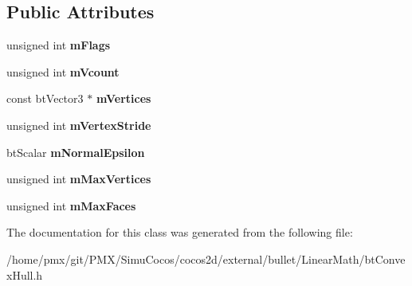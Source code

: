 \subsection*{Public Attributes}
\begin{DoxyCompactItemize}
\item 
\mbox{\label{classHullDesc_a458cec3f34166dbd6e562534deea8eac}} 
unsigned int {\bfseries m\+Flags}
\item 
\mbox{\label{classHullDesc_a294c0dcc9354d0aa20392465d81c2eb1}} 
unsigned int {\bfseries m\+Vcount}
\item 
\mbox{\label{classHullDesc_a9c0f7ac6f59cecf15e65c1f7a8685c06}} 
const bt\+Vector3 $\ast$ {\bfseries m\+Vertices}
\item 
\mbox{\label{classHullDesc_aebbaaec73828a2b1359a27dbff250070}} 
unsigned int {\bfseries m\+Vertex\+Stride}
\item 
\mbox{\label{classHullDesc_a7175db2341ffca96416cc9da630b86d4}} 
bt\+Scalar {\bfseries m\+Normal\+Epsilon}
\item 
\mbox{\label{classHullDesc_ad9c7a335bb50c3025dc9e40c3924dd53}} 
unsigned int {\bfseries m\+Max\+Vertices}
\item 
\mbox{\label{classHullDesc_a72b66029f0d6a27e691ecb8d3bedf205}} 
unsigned int {\bfseries m\+Max\+Faces}
\end{DoxyCompactItemize}


The documentation for this class was generated from the following file\+:\begin{DoxyCompactItemize}
\item 
/home/pmx/git/\+P\+M\+X/\+Simu\+Cocos/cocos2d/external/bullet/\+Linear\+Math/bt\+Convex\+Hull.\+h\end{DoxyCompactItemize}

